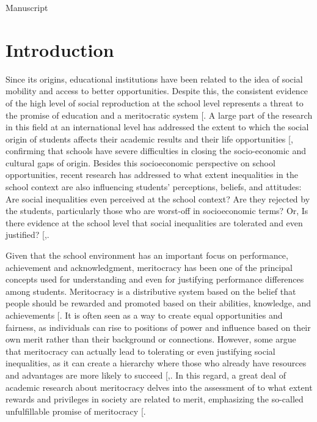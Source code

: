 \documentclass[
  12pt,
  letterpaper,
]{article}
\begin{document}
\newpage{}

\begin{idedos}

Manuscript
\end{idedos}

\section{Introduction}\label{introduction}

Since its origins, educational institutions have been related to the
idea of social mobility and access to better opportunities. Despite
this, the consistent evidence of the high level of social reproduction
at the school level represents a threat to the promise of education and
a meritocratic system
{[}\citeproc{ref-bourdieu_reproduction_1990}{1}{]}. A large part of the
research in this field at an international level has addressed the
extent to which the social origin of students affects their academic
results and their life opportunities
{[}\citeproc{ref-vonhippel_test_2019}{2}{]}, confirming that schools
have severe difficulties in closing the socio-economic and cultural gaps
of origin. Besides this socioeconomic perspective on school
opportunities, recent research has addressed to what extent inequalities
in the school context are also influencing students' perceptions,
beliefs, and attitudes: Are social inequalities even perceived at the
school context? Are they rejected by the students, particularly those
who are worst-off in socioeconomic terms? Or, Is there evidence at the
school level that social inequalities are tolerated and even justified?
{[},\citeproc{ref-wiederkehr_belief_2015}{4}{]}.

Given that the school environment has an important focus on performance,
achievement and acknowledgment, meritocracy has been one of the
principal concepts used for understanding and even for justifying
performance differences among students. Meritocracy is a distributive
system based on the belief that people should be rewarded and promoted
based on their abilities, knowledge, and achievements
{[}\citeproc{ref-young_rise_1958}{5}{]}. It is often seen as a way to
create equal opportunities and fairness, as individuals can rise to
positions of power and influence based on their own merit rather than
their background or connections. However, some argue that meritocracy
can actually lead to tolerating or even justifying social inequalities,
as it can create a hierarchy where those who already have resources and
advantages are more likely to succeed
{[},\citeproc{ref-mcnamee_meritocracy_2004}{7}{]}.
In this regard, a great deal of academic research about meritocracy
delves into the assessment of to what extent rewards and privileges in
society are related to merit, emphasizing the so-called unfulfillable
promise of meritocracy {[}\citeproc{ref-mijs_stratified_2016}{8}{]}.
\end{document}
